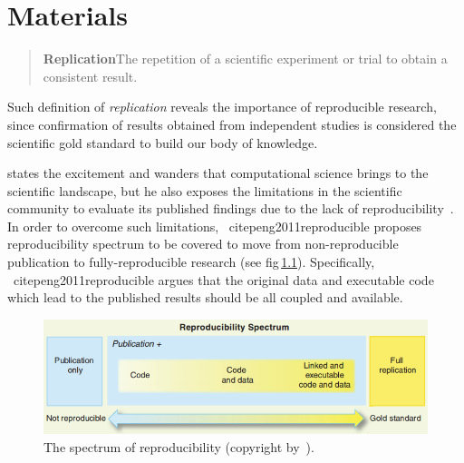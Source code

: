 \graphicspath{{4_materials/figures/}}
\chapter{Materials}\label{chap:4}

\begin{quote}
  \textbf{Replication}\quad The repetition of a scientific
  experiment or trial to obtain a consistent result.
\end{quote}

Such definition of \emph{replication} reveals the importance of reproducible research, since confirmation of results obtained from independent studies is considered the scientific gold standard to build our body of knowledge.

\citeauthor{peng2011reproducible} states the excitement and wanders that computational science brings to the scientific landscape, but he also exposes the limitations in the scientific community to evaluate its published findings due to the lack of reproducibility~\cite{peng2011reproducible}.
In order to overcome such limitations, \citeauthor{peng2011reproducible}~cite{peng2011reproducible} proposes reproducibility spectrum to be covered to move from non-reproducible publication to fully-reproducible research (see \acs{fig}\,\ref{fig:reproducibility_spectrum}).
Specifically, \citeauthor{peng2011reproducible}~cite{peng2011reproducible} argues that the original data and executable code which lead to the published results should be all coupled and available. 

\begin{figure}
\centering
\includegraphics[width=.7\textwidth]{reproducibility_spectrum}
\caption[The spectrum of reproducibility.]{The spectrum of reproducibility (copyright by~\cite{peng2011reproducible}).}
\label{fig:reproducibility_spectrum}
\end{figure}

